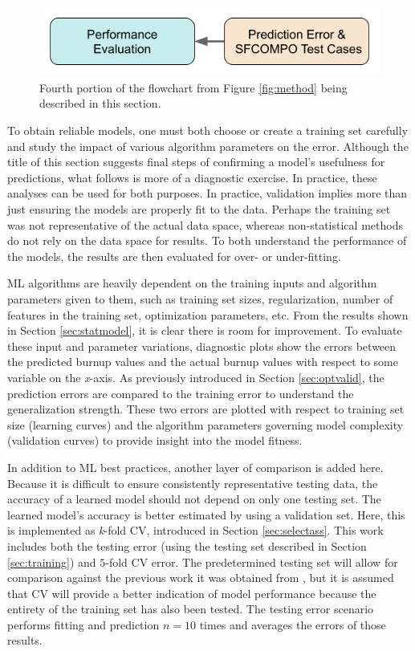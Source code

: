 
\begin{figure}[H]
  \centering
  \includegraphics[width=0.7\linewidth]{./chapters/method/methodology4.png}
  \caption{Fourth portion of the flowchart from Figure \ref{fig:method} being 
           described in this section.}
\end{figure}

To obtain reliable models, one must both choose or create a training set
carefully and study the impact of various algorithm parameters on the error.
Although the title of this section suggests final steps of confirming a model's
usefulness for predictions, what follows is more of a diagnostic exercise. 
In practice, these analyses can be used for both purposes.
In practice, validation implies more than just
ensuring the models are properly fit to the data.  Perhaps the training set was
not representative of the actual data space, whereas non-statistical methods do
not rely on the data space for results. To both understand the performance of
the models, the results are then evaluated for over- or under-fitting. 


\gls{ML} algorithms are heavily dependent on the training inputs and algorithm
parameters given to them, such as training set sizes, regularization, number of
features in the training set, optimization parameters, etc.  From the results
shown in Section \ref{sec:statmodel}, it is clear there is room for
improvement.  To evaluate these input and parameter variations, diagnostic
plots show the errors between the predicted burnup values and the actual burnup
values with respect to some variable on the \textit{x}-axis.  As previously
introduced in Section \ref{sec:optvalid}, the prediction errors are compared to
the training error to understand the generalization strength. These two errors
are plotted with respect to training set size (learning curves) and the
algorithm parameters governing model complexity (validation curves) to provide
insight into the model fitness. 

In addition to \gls{ML} best practices, another layer of comparison is added
here.  Because it is difficult to ensure consistently representative testing
data, the accuracy of a learned model should not depend on only one testing
set.  The learned model's accuracy is better estimated by using a validation
set. Here, this is implemented as \textit{k}-fold \gls{CV}, introduced
in Section \ref{sec:selectass}. This work includes both the testing error
(using the testing set described in Section \ref{sec:training}) and $5$-fold
\gls{CV} error. The predetermined testing set will allow for comparison
against the previous work it was obtained from \cite{dayman_feasibility_2013},
but it is assumed that \gls{CV} will provide a better indication of
model performance because the entirety of the training set has also been
tested.  The testing error scenario performs fitting and prediction $n=10$
times and averages the errors of those results.

